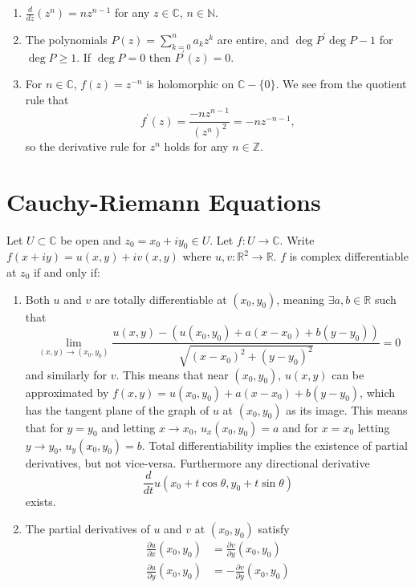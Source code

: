 \begin{xmpl}
  \begin{enumerate}
    \item{
      $\frac{d}{dz} (z^n) = n z^{n-1}$ for any $z \in \mathbb{C}$, $n \in \mathbb{N}$.
    }
    \item{
      The polynomials $P(z) = \sum_{k=0}^n a_k z^k$ are entire, and
      $\deg P^\prime \deg P - 1$ for $\deg P \geq 1$. If $\deg P = 0$ then
      $P^\prime(z) = 0$.
    }
    \item{
      For $n \in \mathbb{C}$, $f(z) = z^{-n}$ is holomorphic on $\mathbb{C} - \{ 0 \}$.
      We see from the quotient rule that
      $$
      f^\prime(z) = \frac{-n z^{n-1}}{(z^n)^2} = -n z^{-n - 1},
      $$
      so the derivative rule for $z^n$ holds for any $n \in \mathbb{Z}$.
    }
  \end{enumerate}
\end{xmpl}

\section{Cauchy-Riemann Equations}

\begin{theorem}
  Let $U \subset \mathbb{C}$ be open and $z_0 = x_0 + i y_0 \in U$.
  Let $f : U \to \mathbb{C}$. Write $f(x + i y) = u (x, y) + i v(x, y)$
  where $u, v : \mathbb{R}^2 \to \mathbb{R}$.
  $f$ is complex differentiable at $z_0$ if and only if:
  \begin{enumerate}
    \item{
      Both $u$ and $v$ are totally differentiable at $(x_0, y_0)$,
      meaning $\exists a, b \in \mathbb{R}$ such that
      $$
      \lim_{(x, y) \to (x_0, y_0)}
        \frac{u(x,y) - (u(x_0, y_0) + a(x - x_0) + b(y - y_0))}
             {\sqrt{(x - x_0)^2 + (y - y_0)^2}}
      = 0
      $$
      and similarly for $v$.
      This means that near $(x_0, y_0)$, $u(x,y)$ can be approximated
      by $f(x, y) = u(x_0, y_0) + a(x - x_0) + b(y - y_0)$, which has
      the tangent plane of the graph of $u$ at $(x_0, y_0)$ as its
      image. This means that for $y = y_0$ and letting $x \to x_0$,
      $u_x(x_0, y_0) = a$ and for $x = x_0$ letting $y \to y_0$,
      $u_y(x_0, y_0) = b$. Total differentiability implies the
      existence of partial derivatives, but not vice-versa.
      Furthermore any directional derivative
      $$
      \frac{d}{dt}u(x_0 + t \cos \theta, y_0 + t \sin \theta)
      $$
      exists.
    }
    \item{
      The partial derivatives of $u$ and $v$ at $(x_0, y_0)$ satisfy
      \begin{align*}
            \frac{\partial u}{\partial x} (x_0, y_0)
        &=  \frac{\partial v}{\partial y} (x_0, y_0) \\
            \frac{\partial u}{\partial y} (x_0, y_0)
        &= -\frac{\partial v}{\partial y} (x_0, y_0)
      \end{align*}
    }
  \end{enumerate}
\end{theorem}

